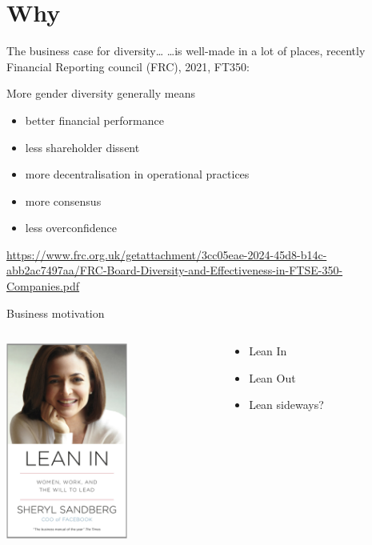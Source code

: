 \documentclass[xcolor=table,aspectratio=169]{beamer}
\begin{document}
\section{Why}

\begin{frame}{The business case for diversity\ldots}
	\ldots is well-made in a lot of places, recently Financial Reporting council (FRC), 2021, FT350:

More gender diversity generally means 
	\begin{itemize}
		\item better financial performance
		\item less shareholder dissent
		\item more decentralisation in operational practices
		\item more consensus
		\item less overconfidence
	\end{itemize}


	\tiny{\url{https://www.frc.org.uk/getattachment/3cc05eae-2024-45d8-b14c-abb2ac7497aa/FRC-Board-Diversity-and-Effectiveness-in-FTSE-350-Companies.pdf}}
\end{frame}

\begin{frame}{Business motivation}
	\begin{columns}
		\begin{column}{0.5\textwidth}
	\includegraphics[width=4cm]{figs/lean.jpg}
		\end{column}
		\begin{column}{0.5\textwidth}
			\begin{itemize}
					\pause
				\item Lean In
					\pause
				\item Lean Out
					\pause
				\item Lean sideways?
			\end{itemize}

		\end{column}
	\end{columns}
\end{frame}
\end{document}

